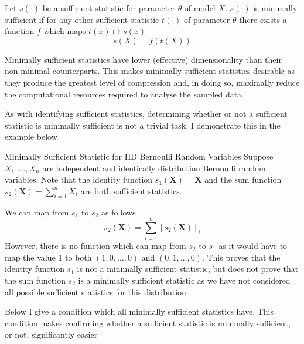 \documentclass[11pt,a4paper,margin=0]{article}
\theoremstyle{break}
\begin{document}
  \begin{box_definition}\label{def_minimally_sufficient_statistic}
    Let $s(\cdot)$ be a sufficient statistic for parameter $\theta$ of model $X$. $s(\cdot)$ is minimally sufficient if for any other sufficient statistic $t(\cdot)$ of parameter $\theta$ there exists a function $f$ which maps $t(x)\mapsto s(x)$  \cite[]{dictionary_of_statistical_terms}
    \[ s(X)=f(t(X)) \]
  \end{box_definition}

  \par Minimally sufficient statistics have lower (effective) dimensionality than their non-minimal counterparts. This makes minimally sufficient statistics desirable as they produce the greatest level of compression and, in doing so, maximally reduce the computational resources required to analyse the sampled data.

  \par As with identifying sufficient statistics, determining whether or not a sufficient statistic is minimally sufficient is not a trivial task. I demonstrate this in the example below

  \begin{example}{Minimally Sufficient Statistic for IID Bernoulli Random Variables}
    Suppose $X_1,\dots,X_n$ are independent and identically distribution Bernoulli random variables. Note that the identity function $s_1(\mathbf{X})=\mathbf{X}$ and the sum function $s_2(\mathbf{X})=\sum_{i=1}^nX_i$ are both sufficient statistics.
    \par We can map from $s_1$ to $s_2$ as follows
    \[ s_2(\mathbf{X})=\sum_{i=1}^n [s_2(\mathbf{X})]_i \]
    However, there is no function which can map from $s_2$ to $s_1$ as it would have to map the value 1 to both $(1,0,\dots,0)$ and $(0,1,\dots,0)$. This proves that the identity function $s_1$ is not a minimally sufficient statistic, but does not prove that the sum function $s_2$ is a minimally sufficient statistic as we have not considered all possible sufficient statistics for this distribution.
  \end{example}

  Below I give a condition which all minimally sufficient statistics have. This condition makes confirming whether a sufficient statistic is minimally sufficient, or not, significantly easier
\end{document}
